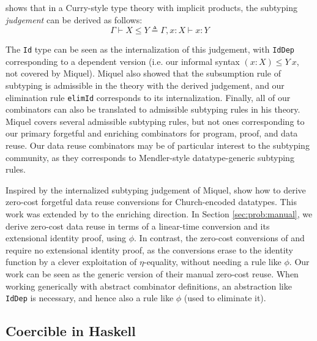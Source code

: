 \documentclass[acmsmall]{acmart}\settopmatter{}
\newcommand{\refsec}[1]{Section \ref{sec:#1}}
\newcommand{\labsec}[1]{\label{sec:#1}}
\begin{document}
\citet{miquel01} shows that in a Curry-style type theory with implicit
products, the subtyping \textit{judgement} can be derived as follows:
$$
\Gamma\vdash X \leq Y \triangleq \Gamma,x:X\vdash x:Y
$$

The \verb;Id; type can be seen as the internalization of this
judgement, with \verb;IdDep; corresponding to a dependent version
(i.e. our informal syntax $(x:X) \leq Y~x$, not covered by Miquel).
Miquel also showed that the subsumption rule of subtyping is
admissible in the theory with the derived judgement, and our
elimination rule \verb;elimId; corresponds to its internalization.
Finally, all of our combinators can also be translated to admissible
subtyping rules in his theory. Miquel covers several admissible
subtyping rules, but not ones corresponding to our primary forgetful
and enriching combinators for program, proof, and data reuse. Our data
reuse combinators may be of particular interest to the subtyping
community, as they corresponds to Mendler-style datatype-generic
subtyping rules.

Inspired by the internalized subtyping judgement of Miquel,
\citet{barras:implicit} show how to derive zero-cost forgetful data
reuse conversions for Church-encoded datatypes.
This work was extended by \citet{diehl} to the enriching direction.
In \refsec{prob:manual}, we derive zero-cost data reuse in terms of a
linear-time conversion and its extensional identity proof, using
$\phi$. In contrast, the zero-cost conversions of
\citet{barras:implicit} and \citet{diehl} require no extensional
identity proof, as the conversions erase to the identity function by a
clever exploitation of $\eta$-equality, without needing a rule like
$\phi$. Our work can be seen as the generic version of their manual
zero-cost reuse. When working generically with abstract combinator
definitions, an abstraction like \verb;IdDep; is necessary,
and hence also a rule like $\phi$ (used to eliminate it).



\subsection{Coercible in Haskell}
\labsec{others:hask}
\end{document}
